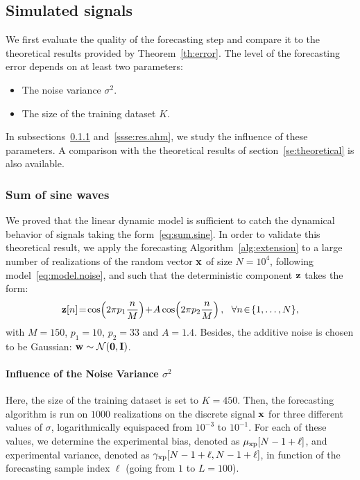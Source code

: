 \subsection{Simulated signals}
We first evaluate the quality of the forecasting step and compare it to the theoretical results provided by Theorem~\ref{th:error}. The level of the forecasting error depends on at least two parameters:
\begin{itemize}
\item The noise variance $\sigma^2$.
\item The size of the training dataset $K$. 
\end{itemize}
In subsections~\ref{ssse:res.sine} and~\ref{ssse:res.ahm}, we study the influence of these parameters. A comparison with the theoretical results of section~\ref{se:theoretical} is also available.

\subsubsection{Sum of sine waves}
\label{ssse:res.sine}
We proved that the linear dynamic model is sufficient to catch the dynamical behavior of signals taking the form~\eqref{eq:sum.sine}. In order to validate this theoretical result, we apply the forecasting Algorithm~\ref{alg:extension} to a large number of realizations of the random vector ${\mathbf x}$ of size $N=10^4$, following model~\eqref{eq:model.noise}, and such that the deterministic component ${\mathbf z}$ takes the form:
\[
\bz[n]\! =\!\cos\!\left(2\pi p_1 \dfrac{n}{M} \right)\! +\! A\cos\!\left(2\pi p_2 \dfrac{n}{M} \right),\quad \!\!\forall n\!\in\!\{1,\ldots,N\},
\]
with $M=150$, $p_1=10$, $p_2=33$ and $A=1.4$. Besides, the additive noise is chosen to be Gaussian: ${\mathbf w}\sim{\mathcal N}(\boldsymbol{0},{\mathbf I})$.

\paragraph{Influence of the Noise Variance $\sigma^2$} Here, the size of the training dataset is set to $K=450$. Then, the forecasting algorithm is run on $1000$ realizations on the discrete signal ${\mathbf x}$ for three different values of $\sigma$, logarithmically equispaced from $10^{-3}$ to $10^{-1}$. For each of these values, we determine the experimental bias, denoted as $\mu_{{\mathrm{xp}}}[N-1+\ell]$, and experimental variance, denoted as $\gamma_{{\mathrm{xp}}}[N-1+\ell,N-1+\ell]$, in function of the forecasting sample index $\ell$ (going from $1$ to $L=100$).

